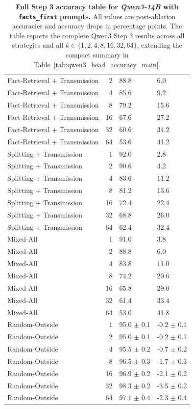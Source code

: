 \documentclass[11pt]{article}
\begin{document}
\begin{table}[p]
{\begin{tabular}{@{} l r l l @{}}
Fact-Retrieval + Transmission & 2 & 88.8 & 6.0 \\
Fact-Retrieval + Transmission & 4 & 85.6 & 9.2 \\
Fact-Retrieval + Transmission & 8 & 79.2 & 15.6 \\
Fact-Retrieval + Transmission & 16 & 67.6 & 27.2 \\
Fact-Retrieval + Transmission & 32 & 60.6 & 34.2 \\
Fact-Retrieval + Transmission & 64 & 53.6 & 41.2 \\
Splitting + Transmission & 1 & 92.0 & 2.8 \\
Splitting + Transmission & 2 & 90.6 & 4.2 \\
Splitting + Transmission & 4 & 83.6 & 11.2 \\
Splitting + Transmission & 8 & 81.2 & 13.6 \\
Splitting + Transmission & 16 & 72.4 & 22.4 \\
Splitting + Transmission & 32 & 68.8 & 26.0 \\
Splitting + Transmission & 64 & 62.4 & 32.4 \\
Mixed-All & 1 & 91.0 & 3.8 \\
Mixed-All & 2 & 88.8 & 6.0 \\
Mixed-All & 4 & 83.8 & 11.0 \\
Mixed-All & 8 & 74.2 & 20.6 \\
Mixed-All & 16 & 65.8 & 29.0 \\
Mixed-All & 32 & 61.4 & 33.4 \\
Mixed-All & 64 & 53.0 & 41.8 \\
Random-Outside & 1 & 95.0 $\pm$ 0.1 & -0.2 $\pm$ 0.1 \\
Random-Outside & 2 & 95.0 $\pm$ 0.1 & -0.2 $\pm$ 0.1 \\
Random-Outside & 4 & 95.5 $\pm$ 0.2 & -0.7 $\pm$ 0.2 \\
Random-Outside & 8 & 96.5 $\pm$ 0.3 & -1.7 $\pm$ 0.3 \\
Random-Outside & 16 & 96.9 $\pm$ 0.2 & -2.1 $\pm$ 0.2 \\
Random-Outside & 32 & 98.3 $\pm$ 0.2 & -3.5 $\pm$ 0.2 \\
Random-Outside & 64 & 97.1 $\pm$ 0.4 & -2.3 $\pm$ 0.4 \\
\bottomrule
\end{tabular}%
}
\caption{\textbf{Full Step 3 accuracy table for \textit{Qwen3-14B} with \texttt{facts\_first} prompts.} All values are post-ablation accuracies and accuracy drops in percentage points. The table reports the complete Qwen3 Step 3 results across all strategies and all $k \in \{1,2,4,8,16,32,64\}$, extending the compact summary in Table~\ref{tab:qwen3_head_accuracy_main}.}
\label{tab:qwen3_14b_ff_full_accuracy}
\end{table}
\end{document}
